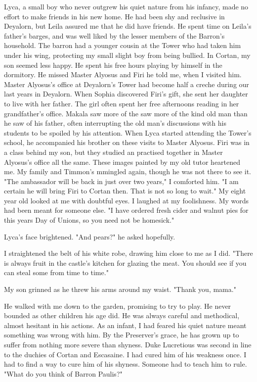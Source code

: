 \documentclass{article}
\begin{document}
Lyca, a small boy who never outgrew his quiet nature from his infancy, made no effort to make friends in his new home. He had been shy and reclusive in Deyalorn, but Leila assured me that he did have friends. He spent time on Leila's father's barges, and was well liked by the lesser members of the Barron's household. The barron had a younger cousin at the Tower who had taken him under his wing, protecting my small slight boy from being bullied. In Cortan, my son seemed less happy. He spent his free hours playing by himself in the dormitory. He missed Master Alyosus and Firi he told me, when I visited him. Master Alyosus's office at Deyalorn's Tower had become half a creche during our last years in Deyalorn. When Sophia discovered Firi's gift, she sent her daughter to live with her father. The girl often spent her free afternoons reading in her grandfather's office. Makala saw more of the saw more of the kind old man than he saw of his father, often interrupting the old man's discussions with his students to be spoiled by his attention. When Lyca started attending the Tower's school, he accompanied his brother on these visits to Master Alyosus. Firi was in a class behind my son, but they studied an practised together in Master Alyosus's office all the same. These images painted by my old tutor heartened me. My family and Timmon's mmingled again, though he was not there to see it. "The ambassador will be back in just over two years," I comforted him. "I am certain he will bring Firi to Cortan then. That is not so long to wait." My eight year old looked at me with doubtful eyes. I laughed at my foolishness. My words had been meant for someone else. "I have ordered fresh cider and walnut pies for this years Day of Unions, so you need not be homesick."

Lyca's face brightened. "And pears?" he asked hopefully.

I straightened the belt of his white robe, drawing him close to me as I did. "There is always fruit in the castle's kitchen for glazing the meat. You should see if you can steal some from time to time."

My son grinned as he threw his arms around my waist. "Thank you, mama." 

He walked with me down to the garden, promising to try to play. He never bounded as other children his age did. He was always careful and methodical, almost hesitant in his actions. As an infant, I had feared his quiet nature meant something was wrong with him. By the Preserver's grace, he has grown up to suffer from nothing more severe than shyness. Duke Lucretious was second in line to the duchies of Cortan and Escasaine. I had cured him of his weakness once. I had to find a way to cure him of his shyness. Someone had to teach him to rule. "What do you think of Barron Paulis?"
\end{document}
